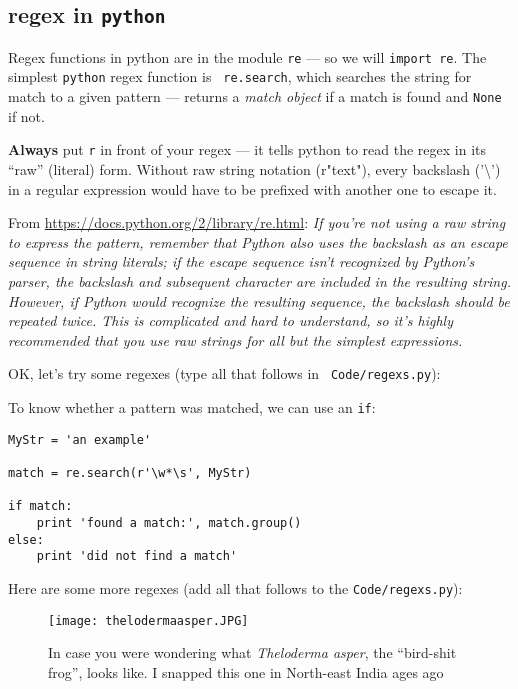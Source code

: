 \subsection {regex in {\tt python}}

Regex functions in python are in the module {\tt re} --- so we will 
{\tt import re}. The simplest {\tt python} regex function is {\tt 
re.search}, which searches the string for match to a given pattern --- 
returns a \textit{match object} if a match is found and {\tt None} if 
not. 

\begin{tipbox}
	
{\bf Always} put {\tt r} in front of your regex --- it tells python to 
read the regex in its ``raw'' (literal) form. Without raw string 
notation (r"text"), every backslash ('\textbackslash') in a regular 
expression would have to be prefixed with another one to escape it. 

From \url{https://docs.python.org/2/library/re.html}: {\it If you're 
not using a raw string to express the pattern, remember that Python 
also uses the backslash as an escape sequence in string literals; if 
the escape sequence isn't recognized by Python's parser, the backslash 
and subsequent character are included in the resulting string. However, 
if Python would recognize the resulting sequence, the backslash should 
be repeated twice. This is complicated and hard to understand, so it's 
highly recommended that you use raw strings for all but the simplest 
expressions.}
\end{tipbox}

OK, let's try some regexes (type all that follows in {\tt 
Code/regexs.py}):



 To know whether a pattern was matched, we can use an {\tt if}:

\begin{lstlisting}
MyStr = 'an example'

match = re.search(r'\w*\s', MyStr)

if match:                      
    print 'found a match:', match.group() 
else:
    print 'did not find a match'    
\end{lstlisting}
  
Here are some more regexes (add all that follows to the {\tt Code/regexs.py}):



\begin{figure}[H] \centering
    \texttt{[image: thelodermaasper.JPG]}
\caption{In case you were wondering what {\it Theloderma asper}, the 
``bird-shit frog'', looks like. I snapped this one in North-east India ages 
ago}
\end{figure}

